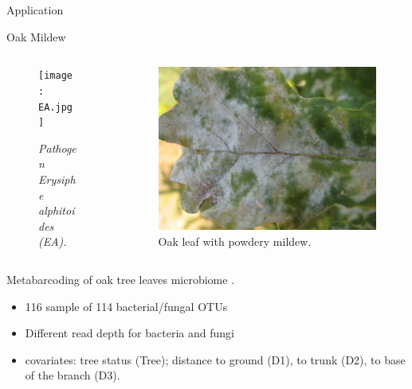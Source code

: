 \documentclass[11pt]{beamer}
\newcommand{\bleu}[1]{\textcolor{Framableulight}{#1}}
\begin{document}
\begin{frame}
\begin{center}
\huge{\bleu{Application}}
\end{center}
\end{frame}
\begin{frame}{Oak Mildew}
\begin{columns}
\begin{column}{5cm}
\begin{figure}[htp]
\centering
\texttt{[image: EA.jpg]}
\caption{\textit{Pathogen Erysiphe alphitoides (EA).}}
\end{figure}
\end{column}
\begin{column}{6cm}
\begin{figure}[htp]
\centering
\includegraphics[scale=0.1]{mildew.jpg}
\caption{Oak leaf with powdery mildew.}
\end{figure}
\end{column}
\end{columns}
\vspace{0.5cm}
Metabarcoding of oak tree leaves microbiome \citep{jakuch}.\\

\begin{itemize}
	\item 116 sample of 114 bacterial/fungal OTUs
	\item Different read depth for bacteria and fungi
	\item covariates: tree status (Tree); distance to ground (D1), to trunk (D2), to base of the branch (D3).
\end{itemize}
\end{frame}
\end{document}
